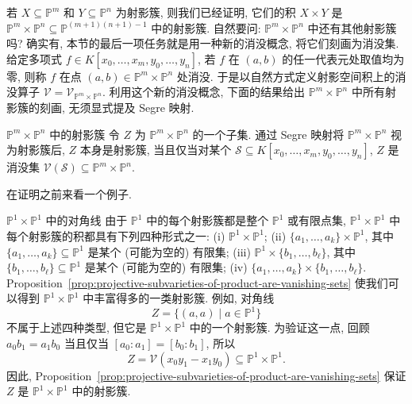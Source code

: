 若 $X\subseteq\mathbb{P}^{m}$ 和 $Y\subseteq\mathbb{P}^{n}$ 为射影簇, 则我们已经证明, 它们的积 $X\times Y$ 是 $\mathbb{P}^{m}\times\mathbb{P}^{n}\subseteq\mathbb{P}^{(m+1)(n+1)-1}$ 中的射影簇. 自然要问: $\mathbb{P}^{m}\times\mathbb{P}^{n}$ 中还有其他射影簇吗? 确实有, 本节的最后一项任务就是用一种新的消没概念, 将它们刻画为消没集. 给定多项式 $f\in K[x_{0},\ldots,x_{m},y_{0},\ldots,y_{n}]$, 若 $f$ 在 $(a,b)$ 的任一代表元处取值均为零, 则称 $f$ 在点 $(a,b)\in\mathbb{P}^{m}\times\mathbb{P}^{n}$ 处消没. 于是以自然方式定义射影空间积上的消没算子 $\mathcal{V}=\mathcal{V}_{\mathbb{P}^{m}\times\mathbb{P}^{n}}$. 利用这个新的消没概念, 下面的结果给出 $\mathbb{P}^{m}\times\mathbb{P}^{n}$ 中所有射影簇的刻画, 无须显式提及 Segre 映射.

\begin{Proposition}{$\mathbb{P}^{m}\times\mathbb{P}^{n}$ 中的射影簇}\leavevmode\label{prop:projective-subvarieties-of-product-are-vanishing-sets}
令 $Z$ 为 $\mathbb{P}^{m}\times\mathbb{P}^{n}$ 的一个子集. 通过 Segre 映射将 $\mathbb{P}^{m}\times\mathbb{P}^{n}$ 视为射影簇后, $Z$ 本身是射影簇, 当且仅当对某个 $\mathcal{S}\subseteq K[x_{0},\ldots,x_{m},y_{0},\ldots,y_{n}]$, $Z$ 是消没集 $\mathcal{V}(\mathcal{S})\subseteq\mathbb{P}^{m}\times\mathbb{P}^{n}$.
\end{Proposition}

在证明之前来看一个例子.

\begin{Example}{$\mathbb{P}^{1}\times\mathbb{P}^{1}$ 中的对角线}\leavevmode\label{ex:diagonal-in-product-of-projective-lines}
由于 $\mathbb{P}^{1}$ 中的每个射影簇都是整个 $\mathbb{P}^{1}$ 或有限点集, $\mathbb{P}^{1}\times\mathbb{P}^{1}$ 中每个射影簇的积都具有下列四种形式之一: (i) $\mathbb{P}^{1}\times\mathbb{P}^{1}$; (ii) $\{a_{1},\ldots,a_{k}\}\times\mathbb{P}^{1}$, 其中 $\{a_{1},\ldots,a_{k}\}\subseteq\mathbb{P}^{1}$ 是某个 (可能为空的) 有限集; (iii) $\mathbb{P}^{1}\times\{b_{1},\ldots,b_{\ell}\}$, 其中 $\{b_{1},\ldots,b_{\ell}\}\subseteq\mathbb{P}^{1}$ 是某个 (可能为空的) 有限集; (iv) $\{a_{1},\ldots,a_{k}\}\times\{b_{1},\ldots,b_{\ell}\}$. Proposition~\ref{prop:projective-subvarieties-of-product-are-vanishing-sets} 使我们可以得到 $\mathbb{P}^{1}\times\mathbb{P}^{1}$ 中丰富得多的一类射影簇. 例如, 对角线
\[
  Z=\{(a,a)\mid a\in\mathbb{P}^{1}\}
\]
不属于上述四种类型, 但它是 $\mathbb{P}^{1}\times\mathbb{P}^{1}$ 中的一个射影簇. 为验证这一点, 回顾 $a_{0}b_{1}=a_{1}b_{0}$ 当且仅当 $[a_{0}:a_{1}]=[b_{0}:b_{1}]$, 所以
\[
  Z=\mathcal{V}(x_{0}y_{1}-x_{1}y_{0})\subseteq\mathbb{P}^{1}\times\mathbb{P}^{1}.
\]
因此, Proposition~\ref{prop:projective-subvarieties-of-product-are-vanishing-sets} 保证 $Z$ 是 $\mathbb{P}^{1}\times\mathbb{P}^{1}$ 中的射影簇.
\end{Example}


